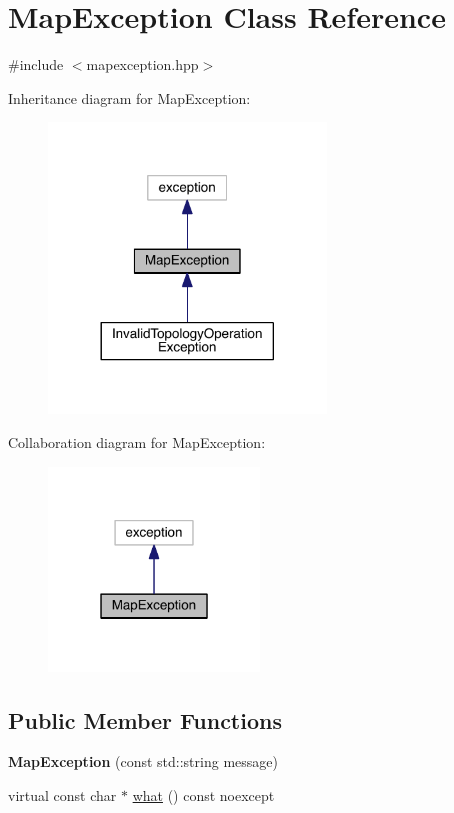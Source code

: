 \hypertarget{class_map_exception}{}\section{Map\+Exception Class Reference}
\label{class_map_exception}


{\ttfamily \#include $<$mapexception.\+hpp$>$}



Inheritance diagram for Map\+Exception\+:
\nopagebreak
\begin{figure}[H]
\begin{center}
\leavevmode
\includegraphics[width=209pt]{class_map_exception__inherit__graph}
\end{center}
\end{figure}


Collaboration diagram for Map\+Exception\+:
\nopagebreak
\begin{figure}[H]
\begin{center}
\leavevmode
\includegraphics[width=159pt]{class_map_exception__coll__graph}
\end{center}
\end{figure}
\subsection*{Public Member Functions}
\begin{DoxyCompactItemize}
\item 
\hypertarget{class_map_exception_a783e9dff13d5386a2cf2601aacee5992}{}\label{class_map_exception_a783e9dff13d5386a2cf2601aacee5992} 
{\bfseries Map\+Exception} (const std\+::string message)
\item 
virtual const char $\ast$ \hyperlink{class_map_exception_a4b9e4cce181943bf8c64ee831be2c10e}{what} () const noexcept
\end{DoxyCompactItemize}


